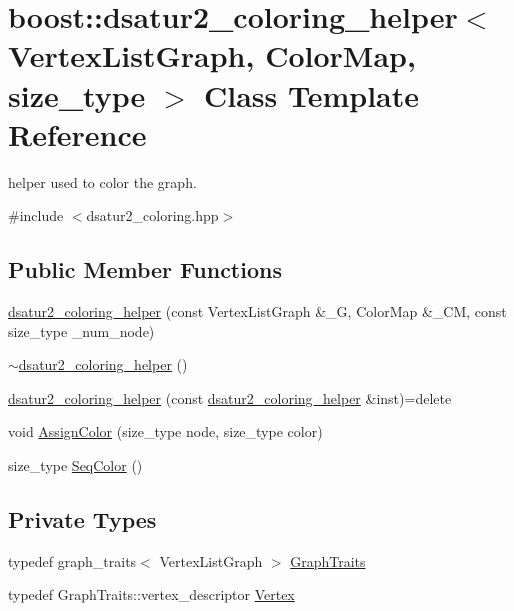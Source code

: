 \hypertarget{classboost_1_1dsatur2__coloring__helper}{}\section{boost\+:\+:dsatur2\+\_\+coloring\+\_\+helper$<$ Vertex\+List\+Graph, Color\+Map, size\+\_\+type $>$ Class Template Reference}
\label{classboost_1_1dsatur2__coloring__helper}


helper used to color the graph.  




{\ttfamily \#include $<$dsatur2\+\_\+coloring.\+hpp$>$}

\subsection*{Public Member Functions}
\begin{DoxyCompactItemize}
\item 
\hyperlink{classboost_1_1dsatur2__coloring__helper_a8514219fbf794c63ffbde8b3492cc346}{dsatur2\+\_\+coloring\+\_\+helper} (const Vertex\+List\+Graph \&\+\_\+G, Color\+Map \&\+\_\+\+CM, const size\+\_\+type \+\_\+num\+\_\+node)
\item 
\hyperlink{classboost_1_1dsatur2__coloring__helper_adc2f1fe76a6dbe5371d3760457145fa3}{$\sim$dsatur2\+\_\+coloring\+\_\+helper} ()
\item 
\hyperlink{classboost_1_1dsatur2__coloring__helper_adc4502c8a6a86fc1fd801c35e38f9f57}{dsatur2\+\_\+coloring\+\_\+helper} (const \hyperlink{classboost_1_1dsatur2__coloring__helper}{dsatur2\+\_\+coloring\+\_\+helper} \&inst)=delete
\item 
void \hyperlink{classboost_1_1dsatur2__coloring__helper_adb927efbacd307f3279d5a6bdd198700}{Assign\+Color} (size\+\_\+type node, size\+\_\+type color)
\item 
size\+\_\+type \hyperlink{classboost_1_1dsatur2__coloring__helper_a0abb8144cff9aa7d05b8bad12b84158c}{Seq\+Color} ()
\end{DoxyCompactItemize}
\subsection*{Private Types}
\begin{DoxyCompactItemize}
\item 
typedef graph\+\_\+traits$<$ Vertex\+List\+Graph $>$ \hyperlink{classboost_1_1dsatur2__coloring__helper_a9a3e34ad1277d60091a43044bb0b76d9}{Graph\+Traits}
\item 
typedef Graph\+Traits\+::vertex\+\_\+descriptor \hyperlink{classboost_1_1dsatur2__coloring__helper_a74e7b43aba95a31b3b06b092482429cb}{Vertex}
\end{DoxyCompactItemize}

